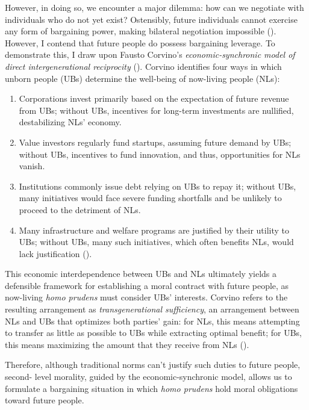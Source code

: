 However, in doing so, we encounter a major dilemma: how can we negotiate with individuals who do not yet exist? Ostensibly, future individuals cannot exercise any form of bargaining power, making bilateral negotiation impossible (\cite[p.\ 17]{kulkarni2024}). However, I contend that future people do possess bargaining leverage. To demonstrate this, I draw upon Fausto Corvino’s \emph{economic-synchronic model of direct intergenerational reciprocity} (\cite[p.\ 398]{corvino2023}). Corvino identifies four ways in which unborn people (UBs) determine the well-being of now-living people (NLs):
\begin{enumerate}

	\item Corporations invest primarily based on the expectation of future revenue from UBs; without UBs, incentives for long-term investments are nullified, destabilizing NLs’ economy.

	\item Value investors regularly fund startups, assuming future demand by UBs; without UBs, incentives to fund innovation, and thus, opportunities for NLs vanish.

	\item Institutions commonly issue debt relying on UBs to repay it; without UBs, many initiatives would face severe funding shortfalls and be unlikely to proceed to the detriment of NLs.

	\item Many infrastructure and welfare programs are justified by their utility to UBs; without UBs, many such initiatives, which often benefits NLs, would lack justification (\cite[pp.\ 400-402]{corvino2023}).

\end{enumerate}

This economic interdependence between UBs and NLs ultimately yields a defensible framework for establishing a moral contract with future people, as now-living \emph{homo prudens} must consider UBs’ interests. Corvino refers to the resulting arrangement as \emph{transgenerational sufficiency}, an arrangement between NLs and UBs that optimizes both parties’ gain: for NLs, this means attempting to transfer as little as possible to UBs while extracting optimal benefit; for UBs, this means maximizing the amount that they receive from NLs (\cite[p.\ 404]{corvino2023}).

Therefore, although traditional norms can’t justify such duties to future people, second- level morality, guided by the economic-synchronic model, allows us to formulate a bargaining situation in which \emph{homo prudens} hold moral obligations toward future people.

